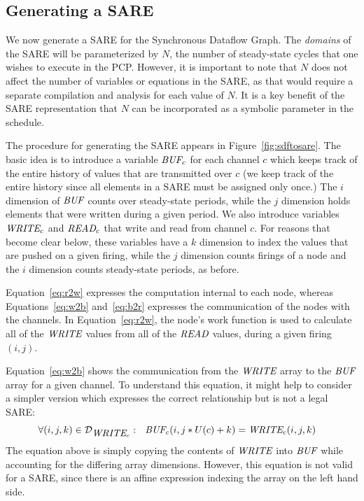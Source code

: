 \subsection{Generating a SARE}
\label{sec:simplesare}

We now generate a SARE for the Synchronous Dataflow Graph.  The {\it
domains} of the SARE will be parameterized by $N$, the number of
steady-state cycles that one wishes to execute in the PCP.  However,
it is important to note that $N$ does not affect the number of
variables or equations in the SARE, as that would require a separate
compilation and analysis for each value of $N$.  It is a key benefit
of the SARE representation that $N$ can be incorporated as a symbolic
parameter in the schedule.

The procedure for generating the SARE appears in
Figure~\ref{fig:sdftosare}.  The basic idea is to introduce a variable
$\mbox{\it BUF}_c$ for each channel $c$ which keeps track of the entire
history of values that are transmitted over $c$ (we keep track of the
entire history since all elements in a SARE must be assigned only
once.)  The $i$ dimension of $\mbox{\it BUF}$ counts over steady-state
periods, while the $j$ dimension holds elements that were written
during a given period.  We also introduce variables $\mbox{\it WRITE}_c$ and
$\mbox{\it READ}_c$ that write and read from channel $c$.  For reasons that
become clear below, these variables have a $k$ dimension to index the
values that are pushed on a given firing, while the $j$ dimension
counts firings of a node and the $i$ dimension counts steady-state
periods, as before.

Equation~\ref{eq:r2w} expresses the computation internal to each node,
whereas Equations~\ref{eq:w2b} and~\ref{eq:b2r} expresses the
communication of the nodes with the channels.  In
Equation~\ref{eq:r2w}, the node's work function is used to calculate
all of the $\mbox{\it WRITE}$ values from all of the $\mbox{\it READ}$ values,
during a given firing $(i,j)$. 

Equation~\ref{eq:w2b} shows the communication from the $\mbox{\it WRITE}$
array to the $\mbox{\it BUF}$ array for a given channel.  To understand this
equation, it might help to consider a simpler version which expresses
the correct relationship but is not a legal SARE:
\begin{align*}
&\forall (i,j,k) \in {\cal D}_{\mbox{\it WRITE}_c}:~~
\mbox{\it BUF}_{c}(i,j*U(c)+k) = \mbox{\it WRITE}_{c}(i, j, k)
\end{align*}
The equation above is simply copying the contents of $\mbox{\it WRITE}$ into
$\mbox{\it BUF}$ while accounting for the differing array dimensions.
However, this equation is not valid for a SARE, since there is an
affine expression indexing the array on the left hand side.

